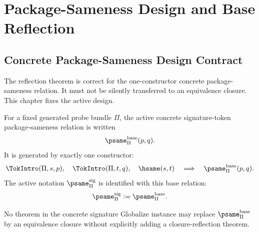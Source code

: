 \chapter{Package-Sameness Design and Base Reflection}
\label{ch:proof-obligations-psame-design}

\section{Concrete Package-Sameness Design Contract}
\label{sec:po-psame-design-contract}

The reflection theorem is correct for the one-constructor concrete package-sameness relation. It must not be silently transferred to an equivalence closure. This chapter fixes the active design.

\begin{definition}
\label{def:base-psame}
For a fixed generated probe bundle \(\Pi\), the active concrete signature-token package-sameness relation is written
$$
  \psame_{\Pi}^{\mathrm{base}}(p,q).
$$
It is generated by exactly one constructor:
$$
  \TokIntro(\Pi,s,p),\quad
  \TokIntro(\Pi,t,q),\quad
  \hsame(s,t)
  \quad\Longrightarrow\quad
  \psame_{\Pi}^{\mathrm{base}}(p,q).
$$
The active notation \(\psame_{\Pi}^{\mathrm{sig}}\) is identified with this base relation:
$$
  \psame_{\Pi}^{\mathrm{sig}} := \psame_{\Pi}^{\mathrm{base}}.
$$
\end{definition}

\begin{principle}
\label{prin:no-implicit-closure}
No theorem in the concrete signature Globalize instance may replace \(\psame_{\Pi}^{\mathrm{base}}\) by an equivalence closure without explicitly adding a closure-reflection theorem.
\end{principle}

